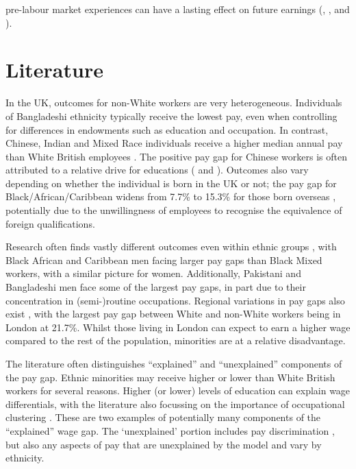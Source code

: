 \documentclass[class=article, crop=false]{standalone}
\begin{document}
pre-labour market experiences can have a lasting effect on future earnings (\citet{Altonji}, \citet{Hedman}, and \citet{Berthoud}). 

\section{Literature}
\label{sec:Literature}
In the UK, outcomes for non-White workers are very heterogeneous. Individuals of Bangladeshi ethnicity typically receive the lowest pay, even when controlling for differences in endowments such as education and occupation. In contrast, Chinese, Indian and Mixed Race individuals receive a higher median annual pay than White British employees \citep{ONSe}. The positive pay gap for Chinese workers is often attributed to a relative drive for educations (\citet{Leslie} and \citet{Berthoud}). Outcomes also vary depending on whether the individual is born in the UK or not; the pay gap for Black/African/Caribbean widens from 7.7\% to 15.3\% for those born overseas \citep{ONSe}, potentially due to the unwillingness of employees to recognise the equivalence of foreign qualifications.

Research often finds vastly different outcomes even within ethnic groups \citep{Heath}, with Black African and Caribbean men facing larger pay gaps than Black Mixed workers, with a similar picture for women. Additionally, Pakistani and Bangladeshi men face some of the largest pay gaps, in part due to their concentration in (semi-)routine occupations. Regional variations in pay gaps also exist \citep{ONSe}, with the largest pay gap between White and non-White workers being in London at 21.7\%. Whilst those living in London can expect to earn a higher wage compared to the rest of the population, minorities are at a relative disadvantage. 

The literature often distinguishes \enquote{explained} and \enquote{unexplained} components of the pay gap. Ethnic minorities may receive higher or lower than White British workers for several reasons. Higher (or lower) levels of education can explain wage differentials, with the literature also focussing on the importance of occupational clustering \citep{Brynin}. These are two examples of potentially many components of the \enquote{explained} wage gap. The \enquote*{unexplained} portion includes pay discrimination \citep{Blackaby}, but also any aspects of pay that are unexplained by the model and vary by ethnicity.
\end{document}
